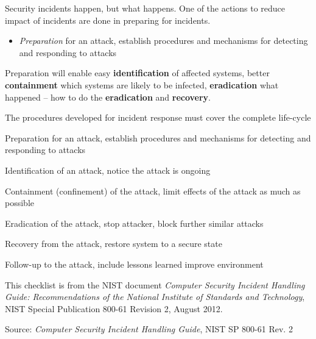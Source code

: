 \documentclass[Screen16to9,17pt]{foils}
\begin{document}
Security incidents happen, but what happens. One of the actions to reduce impact of incidents are done in preparing for incidents.

\begin{itemize}
\item \emph{Preparation} for an attack, establish procedures and mechanisms for detecting and responding to attacks
\end{itemize}

Preparation will enable easy {\bf identification} of affected systems, better {\bf containment} which systems are likely to be infected, {\bf eradication} what happened -- how to do the {\bf eradication} and {\bf recovery}.



The procedures developed for incident response must cover the complete life-cycle

\begin{list2}
\item  Preparation for an attack, establish procedures and mechanisms for detecting and responding to attacks
\item  Identification of an attack, notice the attack is ongoing
\item  Containment (confinement) of the attack, limit effects of the attack as much as possible
\item  Eradication of the attack, stop attacker, block further similar attacks
\item  Recovery from the attack, restore system to a secure state
\item  Follow-up to the attack, include lessons learned  improve environment
\end{list2}







This checklist is from the NIST document
\emph{Computer Security Incident Handling Guide: Recommendations of the National Institute
of Standards and Technology}, NIST Special Publication 800-61
Revision 2, August 2012.



Source: \emph{Computer Security Incident Handling Guide}, NIST SP 800-61 Rev. 2
\end{document}
